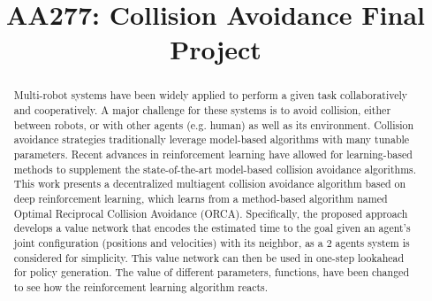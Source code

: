 \documentclass[conference]{IEEEtran}
\begin{document}
\title{AA277: Collision Avoidance Final Project\\
}

\author{
\and
{}
\linebreakand
{}
\and
{}
}

\maketitle
\begin{abstract}
Multi-robot systems have been widely applied to perform a given task collaboratively and cooperatively. A major challenge for these systems is to avoid collision, either between robots, or with other agents (e.g. human) as well as its environment.
Collision avoidance strategies traditionally leverage model-based algorithms with many tunable parameters. Recent advances in reinforcement learning have allowed for learning-based methods to supplement the state-of-the-art model-based collision avoidance algorithms. This work presents a decentralized multiagent collision avoidance algorithm based on deep reinforcement learning, which learns from a method-based algorithm named Optimal Reciprocal Collision Avoidance (ORCA).
Specifically, the proposed approach develops a value network that encodes the estimated time to the goal given an agent’s joint configuration (positions and velocities) with its neighbor, as a 2 agents system is considered for simplicity. This value network can then be used in one-step lookahead for policy generation.
The value of different parameters, functions, have been changed to see how the reinforcement learning algorithm reacts.
\end{abstract}
\end{document}
